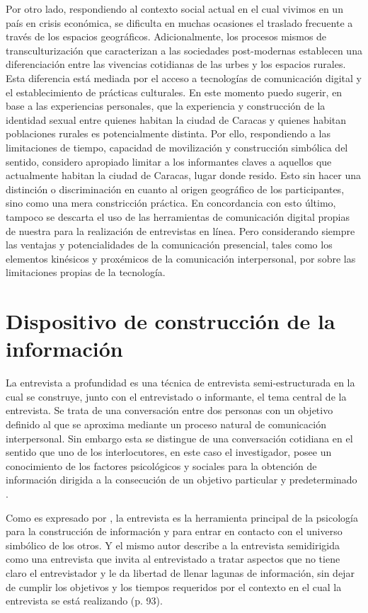   Por otro lado, respondiendo al contexto social actual en el cual vivimos en un
país en crisis económica, se dificulta en muchas ocasiones el traslado
frecuente a través de los espacios geográficos. Adicionalmente, los procesos
mismos de transculturización que caracterizan a las sociedades post-modernas
establecen una diferenciación entre las vivencias cotidianas de las urbes y los
espacios rurales. Esta diferencia está mediada por el acceso a tecnologías de
comunicación digital y el establecimiento de prácticas culturales. En este
momento puedo sugerir, en base a las experiencias personales, que la
experiencia y construcción de la identidad sexual entre quienes habitan la
ciudad de Caracas y quienes habitan poblaciones rurales es potencialmente
distinta. Por ello, respondiendo a las limitaciones de tiempo, capacidad de
movilización y construcción simbólica del sentido, considero apropiado limitar
a los informantes claves a aquellos que actualmente habitan la ciudad de
Caracas, lugar donde resido. Esto sin hacer una distinción o discriminación en
cuanto al origen geográfico de los participantes, sino como una mera
constricción práctica. En concordancia con esto último, tampoco se descarta el
uso de las herramientas de comunicación digital propias de nuestra para la
realización de entrevistas en línea. Pero considerando siempre las ventajas y
potencialidades de la comunicación presencial, tales como los elementos
kinésicos y proxémicos de la comunicación interpersonal, por sobre las
limitaciones propias de la tecnología.

\section{Dispositivo de construcción de la información}

La entrevista a profundidad es una técnica de entrevista semi-estructurada en
la cual se construye, junto con el entrevistado o informante, el tema central
de la entrevista. Se trata de una conversación entre dos personas con un
objetivo definido al que se aproxima mediante un proceso natural de
comunicación interpersonal. Sin embargo esta se distingue de una conversación
cotidiana en el sentido que uno de los interlocutores, en este caso el
investigador, posee un conocimiento de los factores psicológicos y sociales
para la obtención de información dirigida a la consecución de un objetivo
particular y predeterminado \parencite{Hidalgo2005}.

Como es expresado por \textcite{Colin1999}, la entrevista es la herramienta
principal de la psicología para la construcción de información y para entrar en
contacto con el universo simbólico de los otros. Y el mismo autor describe a la
entrevista semidirigida como una entrevista que invita al entrevistado a tratar
aspectos que no tiene claro el entrevistador y le da libertad de llenar lagunas
de información, sin dejar de cumplir los objetivos y los tiempos requeridos por
el contexto en el cual la entrevista se está realizando (p. 93).

